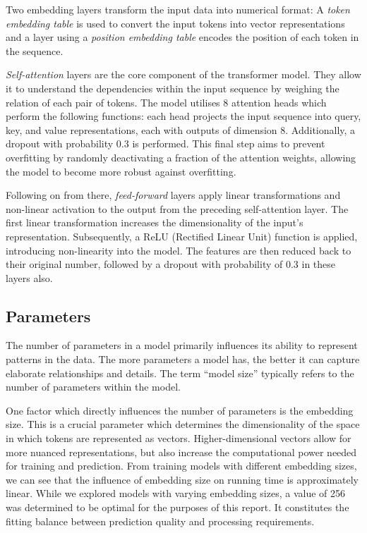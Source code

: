 \documentclass[11pt]{article}
\begin{document}
    Two embedding layers transform the input data into numerical format: A \textit{token embedding table} is used to convert the input tokens into vector representations
    and a layer using a \textit{position embedding table} encodes the position of each token in the sequence.

    \textit{Self-attention} layers are the core component of the transformer model. They allow it to understand the dependencies within the input sequence by weighing the relation of each pair of tokens.
    The model utilises 8 attention heads which perform the following functions: each head projects the input sequence into query, key, and value representations, each with outputs of dimension $8$.
    Additionally, a dropout with probability $0.3$ is performed. This final step aims to prevent overfitting by randomly deactivating a fraction of the attention weights, allowing the model to become more robust against overfitting.

    Following on from there, \textit{feed-forward} layers apply linear transformations and non-linear activation to the output from the preceding self-attention layer.
    The first linear transformation increases the dimensionality of the input's representation.
    Subsequently, a ReLU (Rectified Linear Unit) function is applied, introducing non-linearity into the model.
    The features are then reduced back to their original number, followed by a dropout with probability of $0.3$ in these layers also.

    \subsection*{Parameters}

    The number of parameters in a model primarily influences its ability to represent patterns in the data. The more parameters a model has, the better it can capture elaborate relationships and details.
    The term “model size” typically refers to the number of parameters within the model.

    One factor which directly influences the number of parameters is the embedding size. This is a crucial parameter which determines the dimensionality of the space in which tokens are represented as vectors. Higher-dimensional vectors allow for more nuanced representations, but also increase the computational power needed for training and prediction.
    From training models with different embedding sizes, we can see that the influence of embedding size on running time is approximately linear. While we explored models with varying embedding sizes, a value of 256 was determined to be optimal for the purposes of this report. It constitutes the fitting balance between prediction quality and processing requirements.
\end{document}
